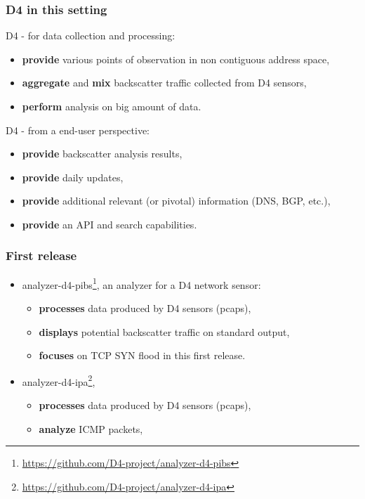 \documentclass{beamer}
\begin{document}
\begin{frame}
        \frametitle{D4 in this setting}

        
        D4 - for data collection and processing:
        \begin{itemize}
          \item {\bf provide} various points of observation in non contiguous address space,
          \item {\bf aggregate} and {\bf mix} backscatter traffic collected from D4 sensors,
          \item {\bf perform} analysis on big amount of data.
        \end{itemize}

        D4 - from a end-user perspective:
        \begin{itemize}
        \item {\bf provide} backscatter analysis results,
        \item {\bf provide} daily updates,
        \item {\bf provide} additional relevant (or pivotal) information (DNS, BGP, etc.),
        \item {\bf provide} an API and search capabilities.
        \end{itemize}

\end{frame}

\begin{frame}
        \frametitle{First release}

 \begin{itemize}
         \item[\checkmark]
           analyzer-d4-pibs\footnote{\url{https://github.com/D4-project/analyzer-d4-pibs}}, an analyzer for a D4 network sensor:

           \begin{itemize}
           \item {\bf processes} data produced by D4 sensors (pcaps),
           \item {\bf displays} potential backscatter traffic on standard output,
           \item {\bf focuses} on TCP SYN flood in this first release.

           \end{itemize}

         \item
           analyzer-d4-ipa\footnote{\url{https://github.com/D4-project/analyzer-d4-ipa}},
           \begin{itemize}
           \item {\bf processes} data produced by D4 sensors (pcaps),
           \item {\bf analyze} ICMP packets,
         \end{itemize}
\end{itemize}
\end{frame}
\end{document}
